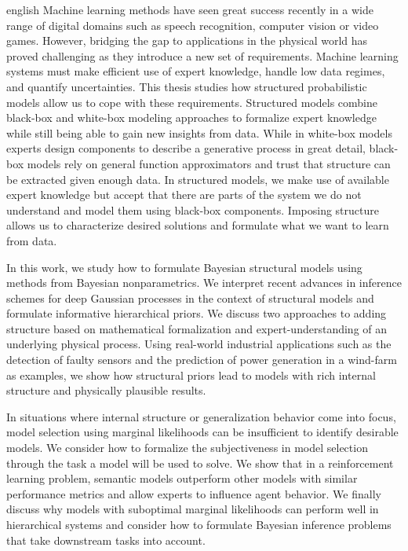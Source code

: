\begin{Abstract}{english}
    Machine learning methods have seen great success recently in a wide range of digital domains such as speech recognition, computer vision or video games.
    However, bridging the gap to applications in the physical world has proved challenging as they introduce a new set of requirements.
    Machine learning systems must make efficient use of expert knowledge, handle low data regimes, and quantify uncertainties.
    This thesis studies how structured probabilistic models allow us to cope with these requirements.
    Structured models combine black-box and white-box modeling approaches to formalize expert knowledge while still being able to gain new insights from data.
    While in white-box models experts design components to describe a generative process in great detail, black-box models rely on general function approximators and trust that structure can be extracted given enough data.
    In structured models, we make use of available expert knowledge but accept that there are parts of the system we do not understand and model them using black-box components.
    Imposing structure allows us to characterize desired solutions and formulate what we want to learn from data.

    In this work, we study how to formulate Bayesian structural models using methods from Bayesian nonparametrics.
    We interpret recent advances in inference schemes for deep Gaussian processes in the context of structural models and formulate informative hierarchical priors.
    We discuss two approaches to adding structure based on mathematical formalization and expert-understanding of an underlying physical process.
    Using real-world industrial applications such as the detection of faulty sensors and the prediction of power generation in a wind-farm as examples, we show how structural priors lead to models with rich internal structure and physically plausible results.

    In situations where internal structure or generalization behavior come into focus, model selection using marginal likelihoods can be insufficient to identify desirable models.
    We consider how to formalize the subjectiveness in model selection through the task a model will be used to solve.
    We show that in a reinforcement learning problem, semantic models outperform other models with similar performance metrics and allow experts to influence agent behavior.
    We finally discuss why models with suboptimal marginal likelihoods can perform well in hierarchical systems and consider how to formulate Bayesian inference problems that take downstream tasks into account.
\end{Abstract}

